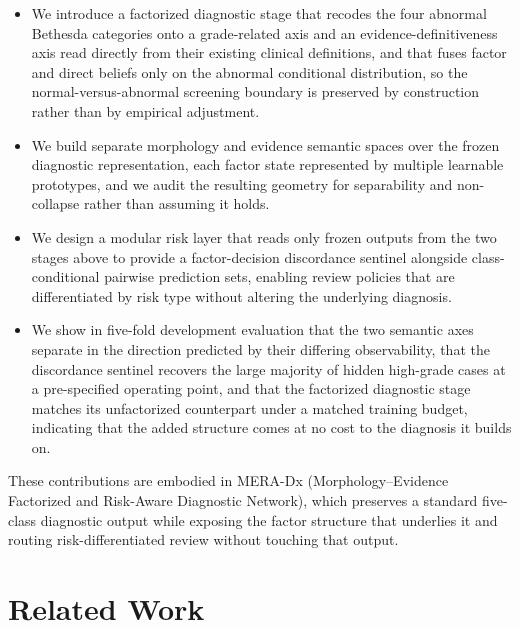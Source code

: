 \documentclass[conference]{IEEEtran}
\begin{document}
\begin{itemize}
\item We introduce a factorized diagnostic stage that recodes the four
abnormal Bethesda categories onto a grade-related axis and an
evidence-definitiveness axis read directly from their existing
clinical definitions, and that fuses factor and direct beliefs only on
the abnormal conditional distribution, so the normal-versus-abnormal
screening boundary is preserved by construction rather than by
empirical adjustment.
\item We build separate morphology and evidence semantic spaces over
the frozen diagnostic representation, each factor state represented by
multiple learnable prototypes, and we audit the resulting geometry for
separability and non-collapse rather than assuming it holds.
\item We design a modular risk layer that reads only frozen outputs
from the two stages above to provide a factor-decision discordance
sentinel alongside class-conditional pairwise prediction sets,
enabling review policies that are differentiated by risk type without
altering the underlying diagnosis.
\item We show in five-fold development evaluation that the two
semantic axes separate in the direction predicted by their differing
observability, that the discordance sentinel recovers the large
majority of hidden high-grade cases at a pre-specified operating
point, and that the factorized diagnostic stage matches its
unfactorized counterpart under a matched training budget, indicating
that the added structure comes at no cost to the diagnosis it builds
on.
\end{itemize}

These contributions are embodied in MERA-Dx (Morphology--Evidence Factorized and Risk-Aware Diagnostic Network), which preserves a standard five-class diagnostic output while exposing the factor structure that underlies it and routing risk-differentiated review without touching that output.

\section{Related Work}
\label{sec:related}
\end{document}
